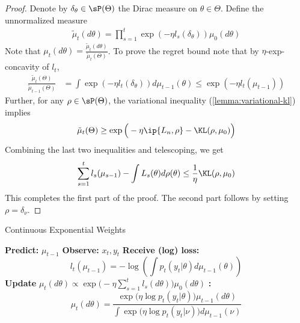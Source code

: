 \begin{proof} Denote by $\delta_{\theta} \in \sP(\Theta)$ the Dirac measure on $\theta \in \Theta$. Define the unnormalized measure 
    \begin{align*}
       \tilde \mu_t(d\theta) = \prod_{s=1}^{t} \exp(-\eta l_s(\delta_\theta)) \mu_0(d\theta)
    \end{align*}
    Note that $\mu_t(d\theta) = \frac{\tilde \mu_t(d\theta)}{\tilde \mu_t(\Theta)}$.
To prove the regret bound note that by $\eta$-exp-concavity of $l_t$,
\begin{align*}
    \frac{\tilde \mu_t(\Theta)}{\tilde \mu_{t-1}(\Theta)} &= \int \exp(-\eta l_t(\delta_\theta)) d\mu_{t-1}(\theta) \leq \exp (- \eta  l_t(\mu_{t-1}) )
\end{align*}
Further, for any $\rho \in \sP(\Theta)$, the variational inequality (\cref{lemma:variational-kl}) implies
\begin{align*}
\tilde \mu_t(\Theta) \geq \exp \Big( - \eta \ip{L_n, \rho} - \KL(\rho, \mu_0)\Big)
\end{align*}
Combining the last two inequalities and telescoping, we get
\begin{align*}
    \sum_{s=1}^t  l_s(\mu_{s-1}) -  \int L_s(\theta) d\rho(\theta) \leq \frac{1}{\eta}\KL(\rho, \mu_0)
\end{align*}
This completes the first part of the proof. The second part follows by setting $\rho=\delta_{\nu}$.
\end{proof}


\LinesNumbered
{}
\begin{algorithm2e}[t]
	\DontPrintSemicolon
	\SetAlgoVlined
	\SetAlgoNoLine
	\SetAlgoNoEnd
	\caption{Continuous Exponential Weights} \label{alg:cew}
    

     {
        \textbf{Predict:} $\mu_{t-1}$\;
        \textbf{Observe:} $x_t, y_t$\;
        \textbf{Receive (log) loss:}$$l_t(\mu_{t-1}) = - \log \left(\int p_t(y_t|\theta)d\mu_{t-1}(\theta)\right)$$\;
        \textbf{Update} $\mu_t(d\theta) \propto \exp\big(-\eta \sum_{s=1}^t l_s(d\theta)\big) \mu_0(d\theta)$ \textbf{:}
        $$\mu_t(d\theta)  = \frac{\exp\big(\eta \log p_t(y_t|\theta)\big) \mu_{t-1}(d\theta)}{\int \exp\big(\eta \log p_t(y_t|\nu)\big) d\mu_{t-1}(\nu)}$$
    }
\end{algorithm2e}

